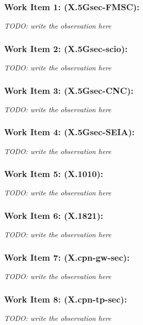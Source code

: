 \subsubsection{Work Item 1: (X.5Gsec-FMSC):}

\textit{TODO: write the observation here}

\subsubsection{Work Item 2: (X.5Gsec-scio):}

\textit{TODO: write the observation here}

\subsubsection{Work Item 3: (X.5Gsec-CNC):}

\textit{TODO: write the observation here}

\subsubsection{Work Item 4: (X.5Gsec-SEIA):}

\textit{TODO: write the observation here}

\subsubsection{Work Item 5: (X.1010):}

\textit{TODO: write the observation here}

\subsubsection{Work Item 6: (X.1821):}

\textit{TODO: write the observation here}

\subsubsection{Work Item 7: (X.cpn-gw-sec):}

\textit{TODO: write the observation here}

\subsubsection{Work Item 8: (X.cpn-tp-sec):}

\textit{TODO: write the observation here}

